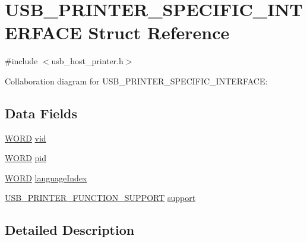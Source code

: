 \hypertarget{struct_u_s_b___p_r_i_n_t_e_r___s_p_e_c_i_f_i_c___i_n_t_e_r_f_a_c_e}{}\section{U\+S\+B\+\_\+\+P\+R\+I\+N\+T\+E\+R\+\_\+\+S\+P\+E\+C\+I\+F\+I\+C\+\_\+\+I\+N\+T\+E\+R\+F\+A\+C\+E Struct Reference}
\label{struct_u_s_b___p_r_i_n_t_e_r___s_p_e_c_i_f_i_c___i_n_t_e_r_f_a_c_e}


{\ttfamily \#include $<$usb\+\_\+host\+\_\+printer.\+h$>$}



Collaboration diagram for U\+S\+B\+\_\+\+P\+R\+I\+N\+T\+E\+R\+\_\+\+S\+P\+E\+C\+I\+F\+I\+C\+\_\+\+I\+N\+T\+E\+R\+F\+A\+C\+E\+:
\subsection*{Data Fields}
\begin{DoxyCompactItemize}
\item 
\hyperlink{_generic_type_defs_8h_a2b0e863dadf920709ec53d9088ee7c91}{W\+O\+R\+D} \hyperlink{struct_u_s_b___p_r_i_n_t_e_r___s_p_e_c_i_f_i_c___i_n_t_e_r_f_a_c_e_a9fcc011b7b6427b55322964f2d01781f}{vid}
\item 
\hyperlink{_generic_type_defs_8h_a2b0e863dadf920709ec53d9088ee7c91}{W\+O\+R\+D} \hyperlink{struct_u_s_b___p_r_i_n_t_e_r___s_p_e_c_i_f_i_c___i_n_t_e_r_f_a_c_e_a718a3b94d880d84d1532ae6411eb60cc}{pid}
\item 
\hyperlink{_generic_type_defs_8h_a2b0e863dadf920709ec53d9088ee7c91}{W\+O\+R\+D} \hyperlink{struct_u_s_b___p_r_i_n_t_e_r___s_p_e_c_i_f_i_c___i_n_t_e_r_f_a_c_e_a1cd62d0ac2234416b8f1b9ebbe561d31}{language\+Index}
\item 
\hyperlink{union_u_s_b___p_r_i_n_t_e_r___f_u_n_c_t_i_o_n___s_u_p_p_o_r_t}{U\+S\+B\+\_\+\+P\+R\+I\+N\+T\+E\+R\+\_\+\+F\+U\+N\+C\+T\+I\+O\+N\+\_\+\+S\+U\+P\+P\+O\+R\+T} \hyperlink{struct_u_s_b___p_r_i_n_t_e_r___s_p_e_c_i_f_i_c___i_n_t_e_r_f_a_c_e_a608dd933f8c7b8e68ea8eb0d6db48cd0}{support}
\end{DoxyCompactItemize}


\subsection{Detailed Description}


